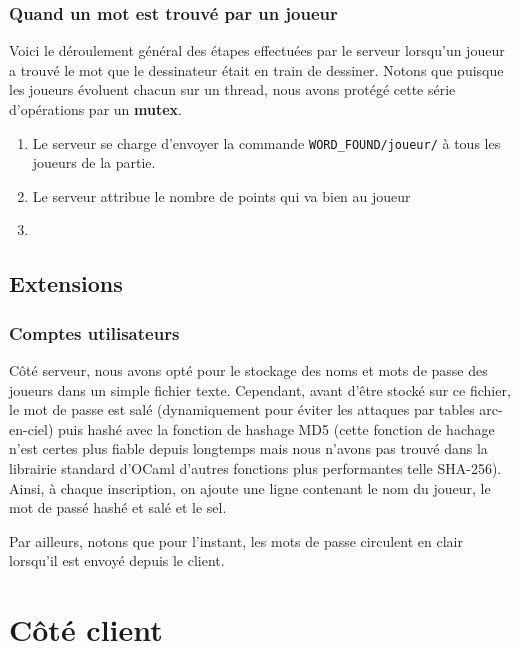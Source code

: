 \documentclass[a4paper, 11pt]{article}
\begin{document}
\subsubsection {Quand un mot est trouvé par un joueur}

Voici le déroulement général des étapes effectuées par le serveur
lorsqu’un joueur a trouvé le mot que le dessinateur était en train de
dessiner. Notons que puisque les joueurs évoluent chacun sur un
thread, nous avons protégé cette série d’opérations par un
\textbf{mutex}.

\begin{enumerate}
\item Le serveur se charge d’envoyer la commande
  \verb+WORD_FOUND/joueur/+ à tous les joueurs de la partie.
\item Le serveur attribue le nombre de points qui va bien au joueur
\item 
\end{enumerate}

\subsection {Extensions}

\subsubsection {Comptes utilisateurs}

Côté serveur, nous avons opté pour le stockage des noms et mots de
passe des joueurs dans un simple fichier texte. Cependant, avant
d'être stocké sur ce fichier, le mot de passe est salé (dynamiquement
pour éviter les attaques par tables arc-en-ciel) puis hashé avec la
fonction de hashage MD5 (cette fonction de hachage n'est certes plus
fiable depuis longtemps mais nous n’avons pas trouvé dans la librairie
standard d'OCaml d’autres fonctions plus performantes telle SHA-256).
Ainsi, à chaque inscription, on ajoute une ligne contenant le nom du
joueur, le mot de passé hashé et salé et le sel.

\bigskip Par ailleurs, notons que pour l’instant, les mots de passe
circulent en clair lorsqu’il est envoyé depuis le client.

\section{Côté client}
\end{document}
